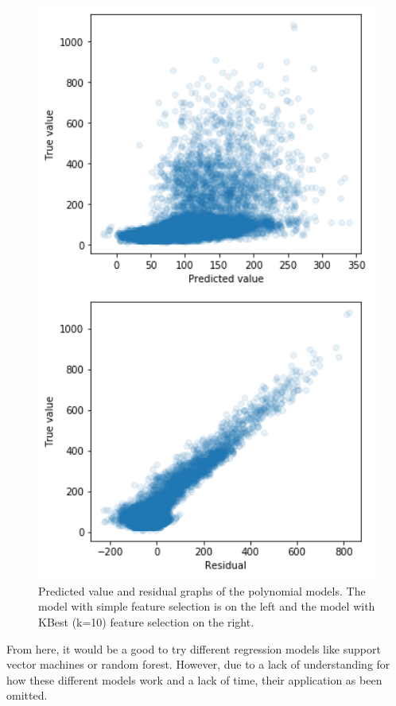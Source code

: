 \documentclass{article}
\begin{document}
\begin{figure}[H]
\begin{minipage}{0.45\textwidth}
\includegraphics[width=1\textwidth, keepaspectratio]{imgs/poly-kfold.png}
\end{minipage}
\caption{Predicted value and residual graphs of the polynomial models. The model with simple feature selection is on the left and the model with KBest (k=10) feature selection on the right.}
\end{figure}
\noindent
From here, it would be a good to try different regression models like support vector machines or random forest. However, due to a lack of understanding for how these different models work and a lack of time, their application as been omitted. 
\end{document}

